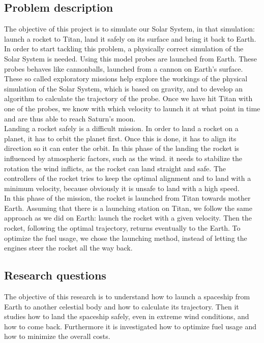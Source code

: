 \documentclass[10pt,a4paper]{article}
\begin{document}
	\subsection{Problem description}
	
	The objective of this project is to simulate our Solar System, in that simulation: launch a rocket to Titan, land it safely on its surface and bring it back to Earth. 
	In order to start tackling this problem, a physically correct simulation of the Solar System is needed. Using this model probes are launched from Earth. These probes behaves like cannonballs, launched from a cannon on Earth's surface. These so called exploratory missions help explore the workings of the physical simulation of the Solar System, which is based on gravity, and to develop an algorithm to calculate the trajectory of the probe. Once we have hit Titan with one of the probes, we know with which velocity to launch it at what point in time and are thus able to reach Saturn's moon.\\    
	
	Landing a rocket safely is a difficult mission. In order to land a rocket on a planet, it has to orbit the planet first. Once this is done, it has to align its direction so it can enter the orbit. In this phase of the landing the rocket is influenced by atmospheric factors, such as the wind. it needs to stabilize the rotation the wind inflicts, as the rocket can land straight and safe. The controllers of the rocket tries to keep the optimal alignment and to land with a minimum velocity, because obviously it is unsafe to land with a high speed.\\
	
	In this phase of the mission, the rocket is launched from Titan towards mother Earth. Assuming that there is a launching station on Titan, we follow the same approach as we did on Earth: launch the rocket with a given velocity. Then the rocket, following the optimal trajectory, returns eventually to the Earth. To optimize the fuel usage, we chose the launching method, instead of letting the engines steer the rocket all the way back.
	
	
	\subsection{Research questions}
	The objective of this research is to understand how to launch a spaceship from Earth to another celestial body and how to calculate its trajectory. Then it studies how to land the spaceship safely, even in extreme wind conditions, and how to come back. Furthermore it is investigated how to optimize fuel usage and how to minimize the overall costs.
	
\end{document}
